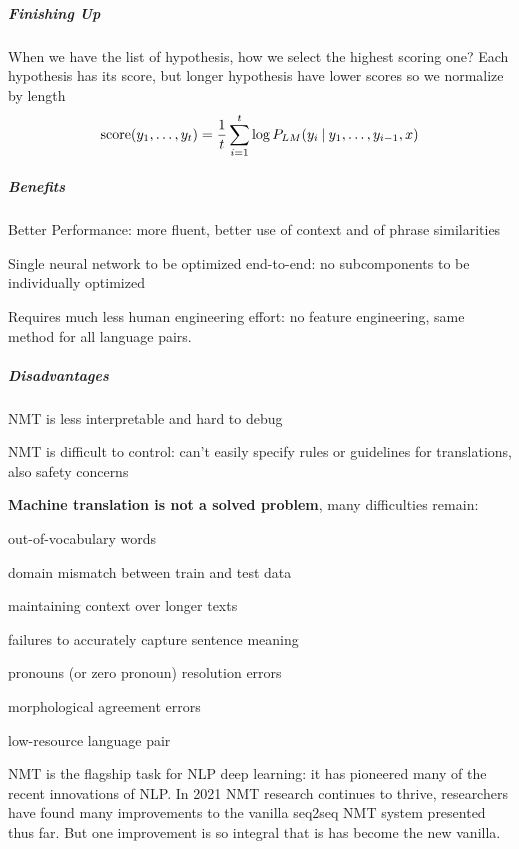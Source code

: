\documentclass[10pt]{report}
\begin{document}
\subparagraph{Finishing Up} When we have the list of hypothesis, how we select the highest scoring one? Each hypothesis has its score, but longer hypothesis have lower scores so we normalize by length
$$\hbox{score}(y_1,\ldots,y_t) =\frac{1}{t}\sum_{i=1}^t \log P_{LM}(y_i\:|\:y_1,\ldots,y_{i-1},x)$$
\begin{multicols}{2}
\subparagraph{Benefits}\begin{list}{}{}
	\item Better Performance: more fluent, better use of context and of phrase similarities
	\item Single neural network to be optimized end-to-end: no subcomponents to be individually optimized
	\item Requires much less human engineering effort: no feature engineering, same method for all language pairs.
\end{list}
\columnbreak
\subparagraph{Disadvantages}\begin{list}{}{}
	\item NMT is less interpretable and hard to debug
	\item NMT is difficult to control: can't easily specify rules or guidelines for translations, also safety concerns
\end{list}
\end{multicols}
\textbf{Machine translation is not a solved problem}, many difficulties remain:
\begin{list}{}{}
	\item out-of-vocabulary words
	\item domain mismatch between train and test data
	\item maintaining context over longer texts
	\item failures to accurately capture sentence meaning
	\item pronouns (or zero pronoun) resolution errors
	\item morphological agreement errors
	\item low-resource language pair
\end{list}
NMT is the flagship task for NLP deep learning: it has pioneered many of the recent innovations of NLP. In 2021 NMT research continues to thrive, researchers have found many improvements to the vanilla seq2seq NMT system presented thus far. But one improvement is so integral that is has become the new vanilla.
\end{document}
